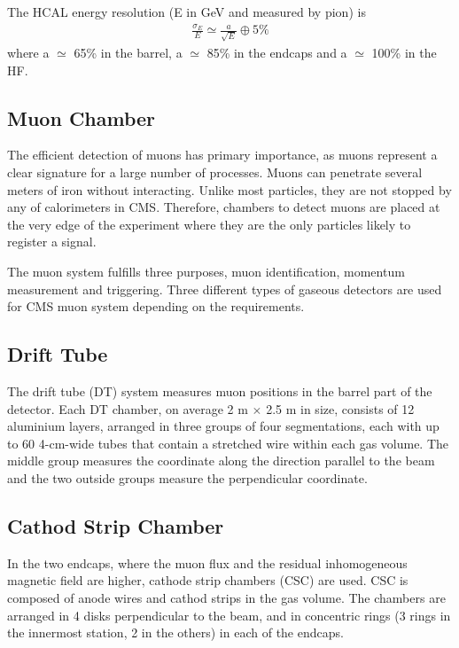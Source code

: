 The HCAL energy resolution (E in GeV and measured by pion) \cite{CMS_AN_2004-020} is
\begin{align}
\frac{\sigma_{E}}{E}\simeq\frac{a}{\sqrt{E}}\oplus 5\%
\end{align}
where a $\simeq$ 65\% in the barrel, a $\simeq$ 85\% in the endcaps and a $\simeq$ 100\% in the HF.

\subsection{Muon Chamber}

The efficient detection of muons has primary importance, as muons represent a clear signature for a large number of processes. Muons can penetrate several meters of iron without interacting. Unlike most particles, they are not stopped by any of calorimeters in CMS. Therefore, chambers to detect muons are placed at the very edge of the experiment where they are the only particles likely to register a signal.

The muon system fulfills three purposes, muon identification, momentum measurement and triggering. Three different types of gaseous detectors are used for CMS muon system depending on the requirements. 

\subsection*{Drift Tube}
The drift tube (DT) system measures muon positions in the barrel part of the detector. Each DT chamber, on average 2 m $\times$ 2.5 m in size, consists of 12 aluminium layers, arranged in three groups of four segmentations, each with up to 60 4-cm-wide tubes that contain a stretched wire within each gas volume. The middle group measures the coordinate along the direction parallel to the beam and the two outside groups measure the perpendicular coordinate.

\subsection*{Cathod Strip Chamber}
In the two endcaps, where the muon flux and the residual inhomogeneous magnetic field are higher, cathode strip chambers (CSC) are used. CSC is composed of anode wires and cathod strips in the gas volume. The chambers are arranged in 4 disks perpendicular to the beam, and in concentric rings (3 rings in the innermost station, 2 in the others) in each of the endcaps.

